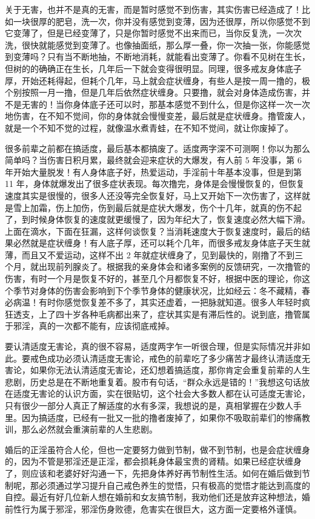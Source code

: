 \begin{case}
    关于无害，也并不是真的无害，而是暂时感觉不到伤害，其实伤害已经造成了！比如一块很厚的肥皂，洗一次，你并没有感觉到变薄，因为还很厚，所以你感觉不到它变薄了，但是已经变薄了，只是你暂时感觉不出来而已，当你反复洗，一次次洗，很快就能感觉到变薄了。也像抽面纸，那么厚一叠，你一次抽一张，你能感觉到变薄吗？只有当不断地抽，不断地消耗，就能看出变薄了。你看不见树在生长，但树的的确确正在生长，几年后一下就会变得很明显。同理，很多戒友身体底子厚，开始还耗得起，但耗个几年，马上就会症状缠身，有些人是按一周一撸的，极个别按照一月一撸，但是几年后依然症状缠身。只要撸，就会对身体造成伤害，并不是无害的！当你身体底子还可以时，那基本感觉不到什么，但是你这样一次一次地伤害，在不知不觉间，你的身体就会慢慢变差，最后就是症状缠身。撸管废人，就是一个不知不觉的过程，就像温水煮青蛙，在不知不觉间，就让你废掉了。

    很多前辈之前都在搞适度，最后基本都搞废了。适度两字深不可测啊！你以为那么简单吗？当伤害日积月累，最终就会迎来症状的大爆发，有人前 5 年没事，第 6 年开始大量脱发！有人身体底子好，热爱运动，手淫前十年基本没事，但是到第 11 年，身体就爆发出了很多症状表现。每次撸完，身体是会慢慢恢复的，但恢复速度其实是很慢的，很多人还没等完全恢复好，马上又开始下一次伤害了，这样就是雪上加霜，伤上加伤，伤到最后就是症状大爆发，伤个十几年，就真的伤不起了，到时候身体恢复的速度就更缓慢了，因为年纪大了，恢复速度必然大幅下滑。上面在滴水，下面在狂漏，这样何谈恢复？当消耗速度大于恢复速度时，最后的结果必然就是症状缠身！有人底子厚，还可以耗个几年，而很多戒友身体底子天生就薄，而且又不爱运动，这样不出 2 年就症状缠身了，见到最快的，刚撸了不到三个月，就出现前列腺炎了。根据我的亲身体会和诸多案例的反馈研究，一次撸管的伤害，有时一个月是恢复不好的，甚至几个月都恢复不好，根据中医的理论，你这个季节对身体的伤害会影响到下个季节身体的健康状况，比如经云：冬不藏精，春必病温！有时你感觉恢复差不多了，其实还虚着，一把脉就知道。很多人年轻时疯狂透支，上了四十岁各种毛病都出来了，症状其实是有滞后性的。说到底，撸管属于邪淫，真的一次都不能有，应该彻底戒掉。

    要认清适度无害论，真的很不容易，适度两字乍一听很合理，但是实际情况并非如此。要戒色成功必须认清适度无害论，戒色的前辈吃了多少痛苦才最终认清适度无害论，如果你无法认清适度无害论，还幻想着搞适度，那你肯定会重复前辈的人生悲剧，历史总是在不断地重复着。股市有句话，“群众永远是错的！”我想这句话放在适度无害论的认识方面，实在很贴切，这个社会大多数人都在认可适度无害论，只有很少一部分人真正了解适度的水有多深，我想说的是，真相掌握在少数人手里。因为搞适度，已经有一批又一批的撸者废掉了，如果你不吸取前辈们的惨痛教训，那么必然就会重演前辈的人生悲剧。

    婚后的正淫虽符合人伦，但也一定要努力做到节制，做不到节制，也是会症状缠身的，因为不管是邪淫还是正淫，都会损耗身体最宝贵的肾精。如果已经症状缠身了，则应该和老婆好好沟通一下，先把身体养好再节制性生活。如何在婚后做到节制呢，那必须通过学习提升自己戒色养生的觉悟，只有极高的觉悟才能达到高度的自控。最近有好几位新人想在婚前和女友搞节制，我劝他们还是放弃这种想法，婚前性行为属于邪淫，邪淫伤身败德，危害实在很巨大，这方面一定要格外谨慎。
\end{case}


